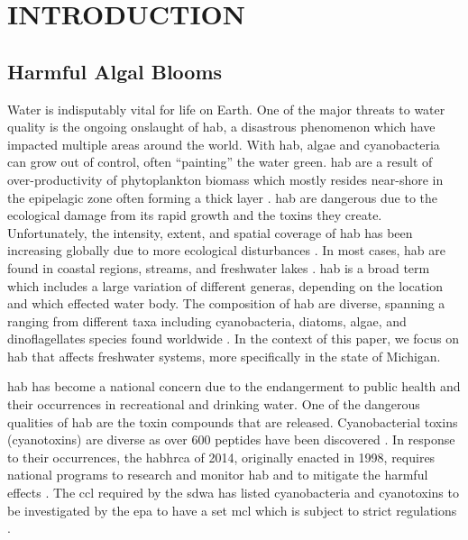 \UseRawInputEncoding
\chapter{INTRODUCTION}
\section{Harmful Algal Blooms}

Water is indisputably vital for life on Earth. One of the major threats to water quality is the ongoing onslaught of \gls{hab}, a disastrous phenomenon which have impacted multiple areas around the world. With \gls{hab}, algae and cyanobacteria can grow out of control, often ``painting'' the water green. \gls{hab} are a result of over-productivity of phytoplankton biomass which mostly resides near-shore in the epipelagic zone often forming a thick layer \cite{moore_richard_cyanobacterial_1993}.  \gls{hab} are dangerous due to the ecological damage from its rapid growth and the toxins they create. Unfortunately, the intensity, extent, and spatial coverage of \gls{hab} has been increasing globally due to more ecological disturbances \cite{codd_cyanobacterial_1999}. In most cases, \gls{hab} are found in coastal regions, streams, and freshwater lakes \cite{rastogi_cyanotoxin-microcystins:_2014}. \gls{hab} is a broad term which includes a large variation of different generas, depending on the location and which effected water body. The composition of \gls{hab} are diverse, spanning a ranging from  different taxa including cyanobacteria, diatoms, algae, and dinoflagellates species found worldwide \cite{dittmann_cyanobacterial_2012}. In the context of this paper, we focus on \gls{hab} that affects freshwater systems, more specifically in the state of Michigan.

\gls{hab} has become a national concern due to the endangerment to public health and their occurrences in recreational and drinking water. One of the dangerous qualities of \gls{hab} are the toxin compounds that are released. Cyanobacterial toxins (cyanotoxins) are diverse as over 600 peptides have been discovered \cite{welker_cyanobacterial_2006}. In response to their occurrences, the \gls{habhrca} of 2014, originally enacted in 1998, requires national programs to research and monitor \gls{hab} and to mitigate the harmful effects \cite{noauthor_harmful_2014}. The \gls{ccl} required by the \gls{sdwa} has listed cyanobacteria and cyanotoxins to be investigated by the \gls{epa} to have a set \gls{mcl} which is subject to strict regulations \cite{usepa_drinking_2016}. 

